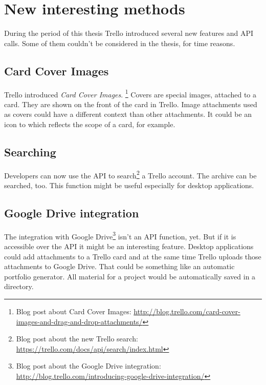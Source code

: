 \section{New interesting methods}
During the period of this thesis Trello introduced several new features and API calls. Some of them couldn't be considered in the thesis, for time reasons.

\subsection{Card Cover Images}
Trello introduced \emph{Card Cover Images}. \footnote{Blog post about Card Cover Images: \url{http://blog.trello.com/card-cover-images-and-drag-and-drop-attachments/}} Covers are special images, attached to a card. They are shown on the front of the card in Trello. Image attachments used as covers could have a different context than other attachments. It could be an icon to which reflects the scope of a card, for example.

\subsection{Searching}
Developers can now use the API to search\footnote{Blog post about the new Trello search: \url{https://trello.com/docs/api/search/index.html}} a Trello account. The archive can be searched, too. This function might be useful especially for desktop applications. 

\subsection{Google Drive integration}
The integration with Google Drive\footnote{Blog post about the Google Drive integration: \url{http://blog.trello.com/introducing-google-drive-integration/}} isn't an API function, yet. But if it is accessible over the API it might be an interesting feature. Desktop applications could add attachments to a Trello card and at the same time Trello uploads those attachments to Google Drive. That could be something like an automatic portfolio generator. All material for a project would be automatically saved in a directory.